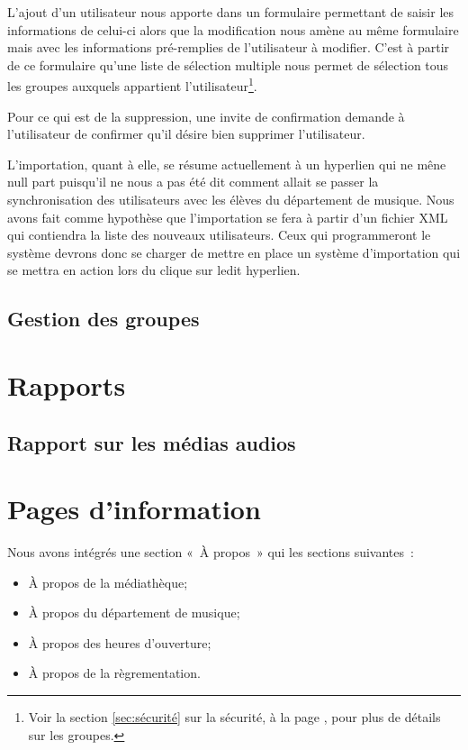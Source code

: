 \documentclass[letter, 11pt]{report}
\begin{document}
L'ajout d'un utilisateur nous apporte dans un formulaire permettant de saisir les informations de celui-ci alors que la modification nous amène au même formulaire mais avec les informations pré-remplies de l'utilisateur à modifier. C'est à partir de ce formulaire qu'une liste de sélection multiple nous permet de sélection tous les groupes auxquels appartient l'utilisateur\footnote{Voir la section \ref{sec:sécurité} sur la sécurité, à la page \pageref{sec:sécurité}, pour plus de détails sur les groupes.}.

Pour ce qui est de la suppression, une invite de confirmation demande à l'utilisateur de confirmer qu'il désire bien supprimer l'utilisateur.

L'importation, quant à elle, se résume actuellement à un hyperlien qui ne mêne null part puisqu'il ne nous a pas été dit comment allait se passer la synchronisation des utilisateurs avec les élèves du département de musique. Nous avons fait comme hypothèse que l'importation se fera à partir d'un fichier XML qui contiendra la liste des nouveaux utilisateurs. Ceux qui programmeront le système devrons donc se charger de mettre en place un système d'importation qui se mettra en action lors du clique sur ledit hyperlien.

\subsection{Gestion des groupes}

\section{Rapports}

\subsection{Rapport sur les médias audios}

\section{Pages d'information}

Nous avons intégrés une section «~À propos~» qui les sections suivantes~:
\begin{itemize}
	\item À propos de la médiathèque;
	\item À propos du département de musique;
	\item À propos des heures d'ouverture;
	\item À propos de la règrementation.
\end{itemize}
\end{document}
